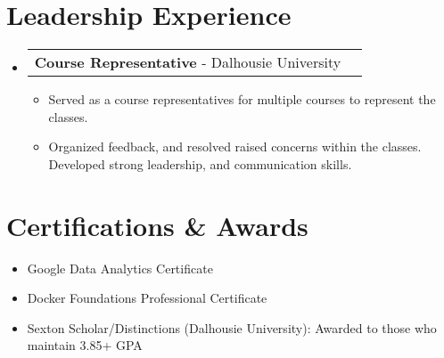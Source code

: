 \documentclass[letterpaper,11pt]{article}
\makeatletter
\newcommand{\resumeLeadershipHeading}[2]{
    \item
    \begin{tabular*}{0.97\textwidth}{l@{\extracolsep{\fill}}r}
      \small#1 & \small#2 \\
    \end{tabular*}\vspace{-5pt}
}
\newcommand{\resumeItem}[1] {\item\small {#1 \vspace{-4pt}}}
\newcommand{\resumeSubHeadingListStart}{\begin{itemize}[leftmargin=0.1in, label={}]}
\newcommand{\resumeSubHeadingListEnd}{\end{itemize}}
\newcommand{\resumeItemListStart}{\begin{itemize}\vspace{-2pt}}
\newcommand{\resumeItemListEnd}{\end{itemize}\vspace{-6pt}}
\newcommand{\resumeItemListStartWithDate}{\begin{itemize}\vspace{-0pt}}
\newcommand{\resumeItemListEndWithDate}{\end{itemize}\vspace{-10pt}}
\newcommand{\resumeItemWithDate}[2] {\item\small {#1 \hfill #2 \vspace{-8pt}}}
\makeatother
\begin{document}
\section{Leadership Experience}
    \resumeSubHeadingListStart
        \resumeLeadershipHeading
        {\textbf{Course Representative} - Dalhousie University}{}
        \resumeItemListStart
            \resumeItem{Served as a course representatives for multiple courses to represent the classes. }
            \resumeItem{Organized feedback, and resolved raised concerns within the classes. Developed strong leadership, and communication skills.}
        \resumeItemListEnd

    \resumeSubHeadingListEnd

\section{Certifications \& Awards}
    \resumeItemListStartWithDate
        \resumeItemWithDate{Google Data Analytics Certificate}{}
        \resumeItemWithDate{Docker Foundations Professional Certificate}{}
        \resumeItemWithDate{Sexton Scholar/Distinctions (Dalhousie University): Awarded to those who maintain 3.85+ GPA}{}
    \resumeItemListEndWithDate

\end{document}
